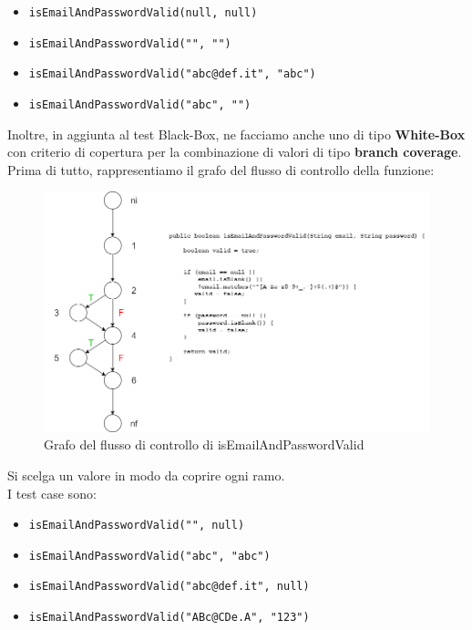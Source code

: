             \begin{itemize}
                \item \texttt{isEmailAndPasswordValid(null, null)} %
                \item \texttt{isEmailAndPasswordValid("", "")} %
                \item \texttt{isEmailAndPasswordValid("abc@def.it", "abc")} %
                \item \texttt{isEmailAndPasswordValid("abc", "")} %
            \end{itemize}

            \noindent Inoltre, in aggiunta al test Black-Box, ne facciamo anche uno di tipo \textbf{White-Box} con criterio di copertura per la combinazione di valori di tipo \textbf{branch coverage}. Prima di tutto, rappresentiamo il grafo del flusso di controllo della funzione:

            \begin{figure}[htbp!]
                \centering
                \includegraphics[width=0.5\linewidth]{Immagini/Verifica Software/Test WB isEmailAndPasswordValid.png}
                \caption{Grafo del flusso di controllo di isEmailAndPasswordValid}
            \end{figure}

            Si scelga un valore in modo da coprire ogni ramo.\\
            
            \noindent I test case sono:

            \begin{itemize}
                \item \texttt{isEmailAndPasswordValid("", null)} %
                \item \texttt{isEmailAndPasswordValid("abc", "abc")} %
                \item \texttt{isEmailAndPasswordValid("abc@def.it", null)} %
                \item \texttt{isEmailAndPasswordValid("ABc@CDe.A", "123")} %
            \end{itemize}

